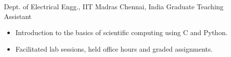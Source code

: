 
        {Dept. of Electrical Engg., IIT Madras}
        {Chennai, India}
        {Graduate Teaching Assistant}
        {}{
    \begin{itemize}
        \item Introduction to the basics of scientific computing using C and Python.
        \item Facilitated lab sessions, held office hours and graded assignments.
    \end{itemize}
}
